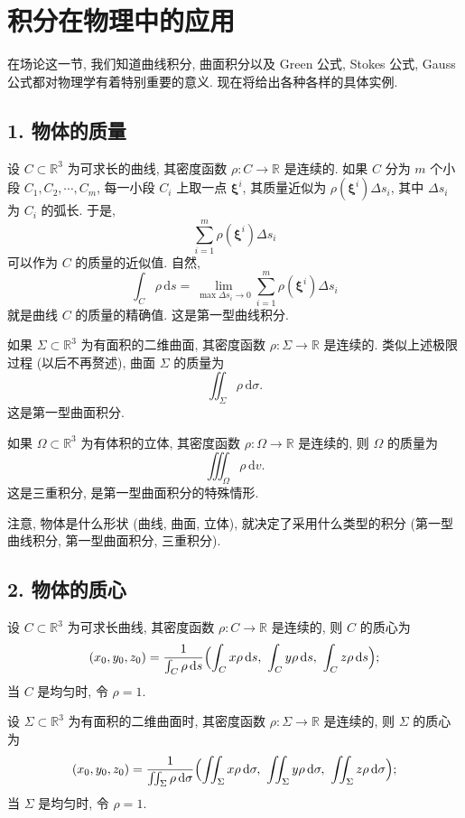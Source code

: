 
\section{积分在物理中的应用}

在场论这一节, 我们知道曲线积分, 曲面积分以及 Green 公式, Stokes 公式, Gauss 公式都对物理学有着特别重要的意义. 现在将给出各种各样的具体实例.

\subsection*{1. 物体的质量}

设 $C\subset\mathbb{R}^{3}$ 为可求长的曲线, 其密度函数 $\rho:C\to\mathbb{R}$ 是连续的. 如果 $C$ 分为 $m$ 个小段 $C_{1},C_{2},\cdots,C_{m}$, 每一小段 $C_{i}$ 上取一点 $\boldsymbol{\xi}^{i}$, 其质量近似为 $\rho(\boldsymbol{\xi}^{i})\Delta s_{i}$, 其中 $\Delta s_{i}$ 为 $C_{i}$ 的弧长. 于是,
\[
\sum_{i=1}^{m}\rho(\boldsymbol{\xi}^{i})\Delta s_{i}
\]
可以作为 $C$ 的质量的近似值. 自然,
\[
\int_{C}\rho\,\mathrm{d}s=\lim_{\max\Delta s_{i}\to0}\sum_{i=1}^{m}\rho(\boldsymbol{\xi}^{i})\Delta s_{i}
\]
就是曲线 $C$ 的质量的精确值. 这是第一型曲线积分.

如果 $\Sigma\subset\mathbb{R}^{3}$ 为有面积的二维曲面, 其密度函数 $\rho:\Sigma\to\mathbb{R}$ 是连续的. 类似上述极限过程 (以后不再赘述), 曲面 $\Sigma$ 的质量为
\[
\iint_{\Sigma}\rho\,\mathrm{d}\sigma.
\]
这是第一型曲面积分.

如果 $\Omega\subset\mathbb{R}^{3}$ 为有体积的立体, 其密度函数 $\rho:\Omega\to\mathbb{R}$ 是连续的, 则 $\Omega$ 的质量为
\[
\iiint_{\Omega}\rho\,\mathrm{d}v.
\]
这是三重积分, 是第一型曲面积分的特殊情形.

注意, 物体是什么形状 (曲线, 曲面, 立体), 就决定了采用什么类型的积分 (第一型曲线积分, 第一型曲面积分, 三重积分).

\subsection*{2. 物体的质心}

设 $C\subset\mathbb{R}^{3}$ 为可求长曲线, 其密度函数 $\rho:C\to\mathbb{R}$ 是连续的, 则 $C$ 的质心为
\[
(x_{0},y_{0},z_{0})=\frac{1}{\int_{C}\rho\,\mathrm{d}s}\Bigl(\int_{C}x\rho\,\mathrm{d}s,\ \int_{C}y\rho\,\mathrm{d}s,\ \int_{C}z\rho\,\mathrm{d}s\Bigr);
\]
当 $C$ 是均匀时, 令 $\rho=1$.

设 $\Sigma\subset\mathbb{R}^{3}$ 为有面积的二维曲面时, 其密度函数 $\rho:\Sigma\to\mathbb{R}$ 是连续的, 则 $\Sigma$ 的质心为
\[
(x_{0},y_{0},z_{0})=\frac{1}{\iint_{\Sigma}\rho\,\mathrm{d}\sigma}\Bigl(\iint_{\Sigma}x\rho\,\mathrm{d}\sigma,\ \iint_{\Sigma}y\rho\,\mathrm{d}\sigma,\ \iint_{\Sigma}z\rho\,\mathrm{d}\sigma\Bigr);
\]
当 $\Sigma$ 是均匀时, 令 $\rho=1$.

